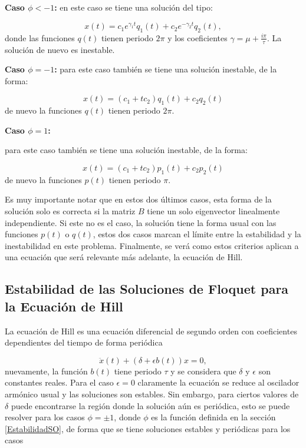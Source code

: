 \documentclass[10pt,a4paper]{report}
\begin{document}
\textbf{Caso $\phi < -1$:} en este caso se tiene una solución del tipo:

\begin{equation}
x(t) =c_1 e^{\gamma_1 t}q_1(t) + c_2 e^{-\gamma_2 t}q_2(t),
\end{equation} donde las funciones $q(t)$ tienen periodo $2\pi$ y los coeficientes $\gamma = \mu + \frac{i\pi}{\tau}$. La solución de nuevo es inestable.

\textbf{Caso $\phi = -1$:} para este caso también se tiene una solución inestable, de la forma:

\begin{equation}
x(t) = (c_1 + tc_2)q_1(t) + c_2q_2(t)
\end{equation} de nuevo la funciones $q(t)$ tienen periodo $2\pi$.

\textbf{Caso $\phi = 1$:}

para este caso también se tiene una solución inestable, de la forma:

\begin{equation}
x(t) = (c_1 + tc_2)p_1(t) + c_2p_2(t)
\end{equation} de nuevo la funciones $p(t)$ tienen periodo $\pi$.

Es muy importante notar que en estos dos últimos casos, esta forma de la solución solo es correcta si la matriz $B$ tiene un solo eigenvector linealmente independiente. Si este no es el caso, la solución tiene la forma usual con las funciones $p(t)$ o $q(t)$, estos dos casos marcan el límite entre la estabilidad y la inestabilidad en este problema. Finalmente, se verá como estos criterios aplican a una ecuación que será relevante más adelante, la ecuación de Hill.

\subsection{Estabilidad de las Soluciones de Floquet para la Ecuación de Hill}

La ecuación de Hill es una ecuación diferencial de segundo orden con coeficientes dependientes del tiempo de forma periódica\cite{WardFT}

\begin{equation}
\ddot{x}(t) + (\delta + \epsilon b(t))x = 0,
\end{equation} nuevamente, la función $b(t)$ tiene periodo $\tau$ y se considera que $\delta$ y $\epsilon$ son constantes reales. Para el caso $\epsilon = 0$ claramente la ecuación se reduce al oscilador armónico usual y las soluciones son estables. Sin embargo, para ciertos valores de $\delta$ puede encontrarse la región donde la solución aún es periódica, esto se puede resolver para los casos $\phi = \pm 1$, donde $\phi$ es la función definida en la sección \eqref{EstabilidadSO}, de forma que se tiene soluciones estables y periódicas para los casos
\end{document}
